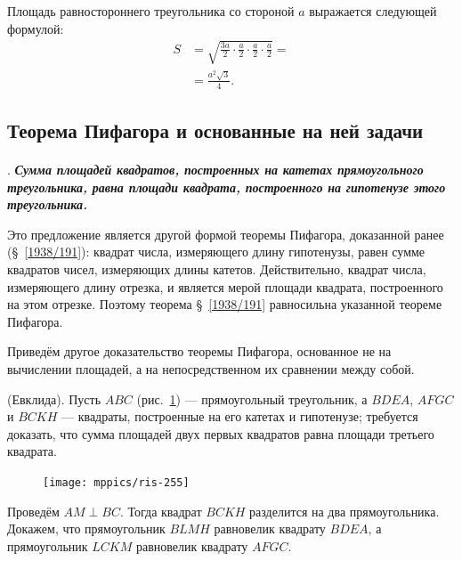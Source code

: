 \documentclass[oneside]{book}
\begin{document}
Площадь равностороннего треугольника со стороной $a$ выражается следующей формулой:
\begin{align*}S&=\sqrt{\frac{3a}2\cdot \frac a2\cdot \frac a2\cdot \frac a2}=
 \\
 &=\frac{a^2\sqrt{3}}{4}.
\end{align*}


\subsection*{Теорема Пифагора и основанные на ней задачи}

\paragraph{}\label{1938/257}
.
\textbf{\emph{Сумма площадей квадратов, построенных на катетах прямоугольного треугольника, равна площади квадрата, построенного на гипотенузе этого треугольника.}}

Это предложение является другой формой теоремы Пифагора, доказанной ранее (§~\ref{1938/191}):
квадрат числа, измеряющего длину гипотенузы, равен сумме квадратов чисел, измеряющих длины катетов.
Действительно, квадрат числа, измеряющего длину отрезка, и является мерой площади квадрата, построенного на этом отрезке.
Поэтому теорема §~\ref{1938/191} равносильна указанной теореме Пифагора.

Приведём другое доказательство теоремы Пифагора, основанное не на вычислении площадей, а на непосредственном их сравнении между собой.


\mbox{} (Евклида).
Пусть $ABC$ (рис.~\ref{1938/ris-255}) — прямоугольный треугольник, а $BDEA$, $AFGC$ и $BCKH$ — квадраты, построенные на его катетах и гипотенузе;
требуется доказать, что сумма площадей двух первых квадратов равна площади третьего квадрата.

\begin{figure}
\centering
\texttt{[image: mppics/ris-255]}
\caption{}\label{1938/ris-255}
\end{figure}

Проведём $AM\perp BC$.
Тогда квадрат $BCKH$ разделится на два прямоугольника.
Докажем, что прямоугольник $BLMH$ равновелик квадрату $BDEA$, а прямоугольник $LCKM$ равновелик квадрату $AFGC$.
\end{document}
